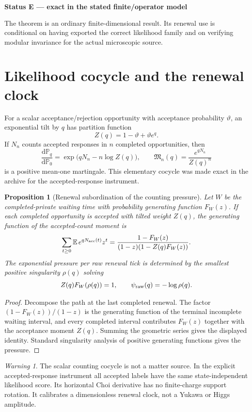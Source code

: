 \documentclass[11pt,oneside,openany]{book}
\numberwithin{equation}{chapter}
\newtheorem{proposition}[theorem]{Proposition}
\theoremstyle{definition}
\theoremstyle{remark}
\newtheorem{warning}[theorem]{Warning}
\newcommand{\dd}{\mathrm d}
\newenvironment{statusbox}[2]{%
  \par\medskip\noindent
  \begin{center}\begin{minipage}{0.94\textwidth}
  \colorbox{#1!8}{\parbox{\dimexpr\linewidth-2\fboxsep\relax}{\textbf{#2}}}\par\smallskip
}{%
  \end{minipage}\end{center}\medskip
}
\newcommand{\Exact}[1]{\begin{statusbox}{ExactColor}{Status E --- exact in the stated finite/operator model}#1\end{statusbox}}
\begin{document}
\Exact{The theorem is an ordinary finite-dimensional result.  Its renewal use is conditional on having exported the correct likelihood family and on verifying modular invariance for the actual microscopic source.}

\section{Likelihood cocycle and the renewal clock}
For a scalar acceptance/rejection opportunity with acceptance probability $\vartheta$, an exponential tilt by $q$ has partition function
\[
 Z(q)=1-\vartheta+\vartheta e^q.
\]
If $N_n$ counts accepted responses in $n$ completed opportunities, then
\[
 \frac{\dd\mathbb P_q}{\dd\mathbb P_0}
 =\exp\bigl(qN_n-n\log Z(q)\bigr),
 \qquad
 \mathfrak M_n(q)=\frac{e^{qN_n}}{Z(q)^n}
\]
is a positive mean-one martingale.  This elementary cocycle was made exact in the archive for the accepted-response instrument.

\begin{proposition}[Renewal subordination of the counting pressure]
\label{prop:renewal-pressure}
Let $W$ be the completed-private waiting time with probability generating function $F_W(z)$.  If each completed opportunity is accepted with tilted weight $Z(q)$, the generating function of the accepted-count moment is
\[
 \sum_{t\ge0}\mathbb E\,e^{qN_{\rm acc}(t)}z^t
 =\frac{1-F_W(z)}{(1-z)(1-Z(q)F_W(z))}.
\]
The exponential pressure per raw renewal tick is determined by the smallest positive singularity $\rho(q)$ solving
\[
 Z(q)F_W(\rho(q))=1,
 \qquad
 \psi_{\rm raw}(q)=-\log\rho(q).
\]
\end{proposition}

\begin{proof}
Decompose the path at the last completed renewal.  The factor $(1-F_W(z))/(1-z)$ is the generating function of the terminal incomplete waiting interval, and every completed interval contributes $F_W(z)$ together with the acceptance moment $Z(q)$.  Summing the geometric series gives the displayed identity.  Standard singularity analysis of positive generating functions gives the pressure.
\end{proof}

\begin{warning}
The scalar counting cocycle is not a matter source.  In the explicit accepted-response instrument all accepted labels have the same state-independent likelihood score.  Its horizontal Choi derivative has no finite-charge support rotation.  It calibrates a dimensionless renewal clock, not a Yukawa or Higgs amplitude.
\end{warning}
\end{document}
